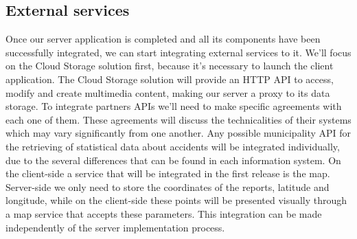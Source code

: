 \subsection{External services}
Once our server application is completed and all its components have been successfully integrated,
we can start integrating external services to it.
\newline
\newline
We'll focus on the Cloud Storage solution first, because it's necessary to launch the client application.
The Cloud Storage solution will provide an HTTP API to access, modify and create multimedia content,
making our server a proxy to its data storage.
\newline
\newline
To integrate partners APIs we'll need to make specific agreements with each one of them. These
agreements will discuss the technicalities of their systems which may vary significantly from
one another.
\newline
\newline
Any possible municipality API for the retrieving of
statistical data about accidents will be integrated individually, due to the several differences
that can be found in each information system.
\newline
\newline
On the client-side a service that will be integrated in the first release is the map. Server-side we only need
to store the coordinates of the reports, latitude and longitude, while on the client-side these points will be presented
visually through a map service that accepts these parameters. 
This integration can be made independently of the server implementation process.
\newline
\newline
